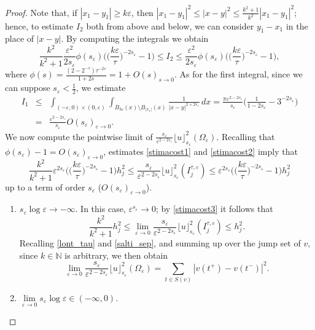 \documentclass[11pt]{article}
\def\e{\varepsilon}
\begin{document}
\begin{proof}
Note that, if $|x_1-y_1|\geq k\e$, 
then $|x_1-y_1|^2\leq |x-y|^2\leq \frac{k^2+1}{k^2}|x_1-y_1|^2$; hence, to estimate $I_2$ both from above and below, we can consider $y_1-x_1$ in the place of $|x-y|$. 
By computing the integrals we obtain 
\begin{equation}\label{stimacost1}
\frac{k^2}{k^2+1}\frac{\e^2}{2s_\e} \phi(s_\e) \Big(\big(\frac{k\e}{\tau}\big)^{-2s_\e}-1\Big) \leq I_2\leq \frac{\e^2}{2s_\e} \phi(s_\e) \Big(\big(\frac{k\e}{\tau}\big)^{-2s_\e}-1\Big), 
\end{equation}
where $\phi(s)=\frac{(2-2^{-s})\tau^{-2s}}{1+2s}=1+O(s)_{s\to 0}$.  
As for the first integral, since we can suppose $s_\e<\frac{1}{2}$, we estimate 
\begin{eqnarray}\label{stimacost2}
I_1&\leq&\int_{(-\e,0)\times(0,\e)} \int_{B_{3\e}(x)\setminus B_{|x_1|}(x)}\frac{1}{|x-y|^{2+2s_\e}}\, dx 
=\frac{\pi\e^{2-2s_\e}}{s_\e}\big( \frac{1}{1-2s_\e}  -3^{-2s_\e}\big)\nonumber\\
&=& \frac{\e^{2-2s_\e}}{s_\e} O(s_\e)_{\e\to 0}.  
\end{eqnarray} 
We now compute the pointwise limit of $\frac{s_\e}{\e^{2-2s_\e}}\lfloor u\rfloor_{s_\e}^2(\Omega_\e)$. 
Recalling that $\phi(s_\e)- 1=O(s_\e)_{\e\to 0}$, estimates \eqref{stimacost1} and \eqref{stimacost2} imply that  
\begin{equation}\label{stimacost3}
\frac{k^2}{k^2+1}\e^{2s_\e} \Big(\big(\frac{k\e}{\tau}\big)^{-2s_\e}-1\Big) h_j^2\leq 
\frac{s_\e}{\e^{2-2s_\e}}\lfloor u\rfloor_{s_\e}^2(I_j^{\tau,\e})\leq\e^{2s_\e}\Big(\big(\frac{k\e}{\tau}\big)^{-2s_\e}-1\Big)h_j^2
\end{equation}
up to a term of order $s_\e$ ($O(s_\e)_{\e\to 0}$). 
\begin{enumerate}
\item[$\bullet$] $s_\e\log\e\to -\infty$.
In this case, $\e^{s_\e}\to 0$; by \eqref{stimacost3} it follows that 
\begin{equation}\label{stimacost4}
\frac{k^{2}}{k^2+1} h_j^2
\leq \lim_{\e\to 0}\frac{s_\e}{\e^{2-2s_\e}}\lfloor u\rfloor_{s_\e}^2(I_j^{\tau,\e})\leq 
h_j^2.
\end{equation}
Recalling \eqref{lont_tau} and \eqref{salti_sep}, and summing up over the jump set of $v$, since $k\in \mathbb N$ is arbitrary, we then obtain 
$$\lim_{\e\to 0} \frac{s_\e}{\e^{2-2s_\e}}\lfloor u\rfloor_{s_\e}^2(\Omega_\e)=\sum_{t\in S(v)} |v(t^+)-v(t^-)|^2.$$
\item[$\bullet$] $\lim\limits_{\e\to 0}s_\e\log\e\in(-\infty,0)$.

\end{enumerate}
\end{proof}
\end{document}
